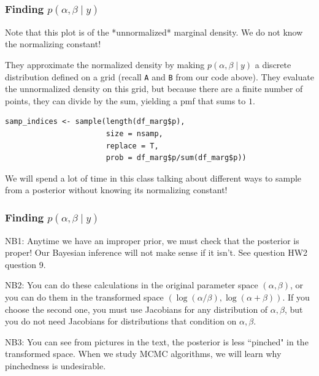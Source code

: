 \documentclass{beamer}
\begin{document}
\begin{frame}[fragile]
\frametitle{Finding $p(\alpha,\beta \mid y)$ }

Note that this plot is of the *unnormalized* marginal density. We do not know the normalizing constant!
\newline

They approximate the normalized density by making $p(\alpha,\beta \mid y)$ a discrete distribution defined on a grid (recall \verb|A| and \verb|B| from our code above). They evaluate the unnormalized density on this grid, but because there are a finite number of points, they can divide by the sum, yielding a pmf that sums to $1$. 

\begin{verbatim}
samp_indices <- sample(length(df_marg$p), 
                       size = nsamp,
                       replace = T, 
                       prob = df_marg$p/sum(df_marg$p))
\end{verbatim}
\pause

We will spend a lot of time in this class talking about different ways to sample from a posterior without knowing its normalizing constant!

\end{frame}
\begin{frame}
\frametitle{Finding $p(\alpha,\beta \mid y)$ }

NB1: Anytime we have an improper prior, we must check that the posterior is proper! Our Bayesian inference will not make sense if it isn't. See question HW2 question 9.
\newline
\pause

NB2: You can do these calculations in the original parameter space $(\alpha, \beta)$, or you can do them in the transformed space $(\log(\alpha/\beta), \log(\alpha+\beta))$. If you choose the second one, you must use Jacobians for any distribution of $\alpha,\beta$, but you do not need Jacobians for distributions that condition on $\alpha,\beta$. 
\newline
\pause

NB3: You can see from pictures in the text, the posterior is less ``pinched" in the transformed space.  When we study MCMC algorithms, we will learn why pinchedness is undesirable.

\end{frame}
\end{document}
